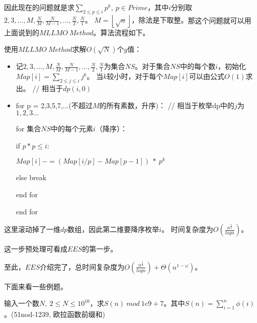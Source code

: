 \begin{solution}
\begin{itemize}
	{\heiti 因此现在的问题就是求$\sum_{2\le p\le i}p^{k},\ p\in Prime$，其中$i$分别取$2,3,...,M,\frac{N}{M},\frac{N}{M-1},...,\frac{N}{2},\frac{N}{1}$。
	$M=\left\lfloor \sqrt{n} \right\rfloor$，除法是下取整。}那这个问题就可以用上面说到的$MLLMO\ Method$。算法流程如下。
\end{itemize}
	
\vbox{}
	
{\heiti 使用$MLLMO\ Method$求解$O(\sqrt{N})$个$g$值：}

\begin{itemize}
	\item 记$2,3,...,M,\frac{N}{M},\frac{N}{M-1},...,\frac{N}{2},\frac{N}{1}$为集合$NS$。对于集合$NS$中的每个数$i$，初始化$Map[i] = \sum_{2\le j\le i}j^k$。
	当$k$较小时，对于每个$Map[i]$可以由公式$O(1)$求出。{\color{red} // 相当于$dp(i,0)$}
	\item for p = 2,3,5,7,...(不超过$M$的所有素数，升序)：{\color{red} // 相当于枚举dp中的$j$为$1,2,3...$}
	
	\quad \quad for 集合$NS$中的每个元素$i$（降序）：
	
	\quad \quad \quad \quad if $p*p\le i$:
	
	\quad \quad \quad \quad \quad \quad $Map[i]-=(Map[i/p] - Map[p-1])\ *\ p^k$
	
	\quad \quad \quad \quad else break
	
	\quad \quad end for
	
	end for
\end{itemize}

\begin{note}
	这里滚动掉了一维$dp$数组，因此第二维要降序枚举$i$。
	时间复杂度为$O(\frac {n^{\frac 3 4}}{ log n})$。
	
	这一步预处理可看成$EES$的第一步。
\end{note}
	
\vbox{}
	
\end{solution}

至此，$EES$介绍完了，总时间复杂度为$O(\frac {n^{\frac 3 4}}{ log n})+\Theta(n^{1-\omega})$。

下面来看一些例题。

\vbox{}

\begin{example}
	输入一个数$N,\ 2\le N\le 10^{10}$，求$S(n)\ mod\ 1e9+7$。其中$S(n)=\sum_{i=1}^{n}\phi(i)$。(51nod-1239, 欧拉函数前缀和)
\end{example}







